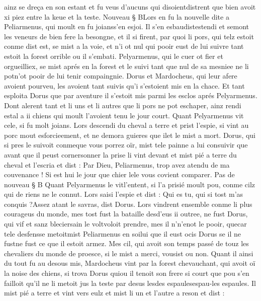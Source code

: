 \documentclass{article}
\begin{document}
\begin{pages}
   ainz se dreça en son estant et fu veus d’aucuns qui disoientdistrent 
   que bien avoit xi piez entre la keue et la teste. 
   Nouveau § BLors en fu la nouvelle dite a Peliarmenus,
   qui moult en fu joianss'en esjoi. 
   Il s’en esbaudistestendi et semont les veneurs de bien fere la besongne, 
   et il si firent, par quoi li pors, qui telz estoit conme dist est, se mist a la voie, et n’i ot nul qui pooir 
   eust de lui suivre tant estoit la forest orrible ou il s’embati. 
   Pelyarmenus, qui le cuer ot fier et orgueilliex, se mist aprés en 
   la forest et le suivi tant que nul de sa mesniee 
   ne li potn'ot pooir de lui tenir compaingnie. 
   Dorus et Mardocheus, qui leur afere avoient pourveu, 
   les avoient tant suivis qu’i s’estoient mis en la chace. Et tant esploita Dorus que par aventure 
   il s’estoit mis parmi les esclos aprés Pelyarmenus. 
   Dont alerent tant et li uns et li autres que li pors ne pot eschaper, ainz rendi estal a ii chiens 
   qui moult l’avoient tenu le jour court. Quant Pelyarmenus vit 
   cele, si fu molt joians. 
   Lors descendi du cheval a terre et prist l’espie, si vint au porc 
   mout esforcieement, et ne demora guieres que ilet le mist a mort. 
   Dorus, qui si pres le suivoit 
   conmeque vous porrez oïr, 
   mist tele painne a lui consuivir que avant que il peust cornersonner la prise 
   li vint devant et mist pié a terre du cheval et l’escria et dist :
   Par Dieu, Peliarmenus, trop avez atendu de ma couvenance ! 
      Si est hui le jour que chier lele vous covient comparer. \pend
\pstart Pas de nouveau § B
   Quant Pelyarmenus 
   le vitl'entent, 
   si l’a prisié moult pou, conme cilz qui de riens ne le connut. Lors saisi l’espie et dist :
   Qui es tu, qui si tost m’as conquis ?Assez atant le savras, dist Dorus. 
   Lors vindrent ensemble conme li plus courageus du monde, mes tost fust la bataille 
   desd'eus ii outree, 
   ne fust Dorus, qui vif et sanz bleciersain 
   le voltvoloit prendre, mes il 
   n’n'enot le pooir, 
   quecar tele desfensse 
   metoitmist Peliarmenus 
   en soilui que il eust ocis Dorus 
   se il ne fustne fust ce que il estoit armez. Mes cil, 
   qui avoit son temps passé de touz les chevaliers du monde de proesce, si le mist a merci, vousist ou non. \pend
\pstart Quant il ainsi du tout fu au desous mis, 
   Mardocheus vint par la forest chevauchant, qui avoit oï la noise des chiens, 
   si trova Dorus quiou il 
   tenoit son frere si court que pou s’en failloit qu’il ne li metoit jus la teste 
   par desus lesdes 
   espaulesespau-les espaules. 
   Il mist pié a terre et vint vers eulz et mist li un et l’autre a reson et dist :

\end{pages}
\end{document}
